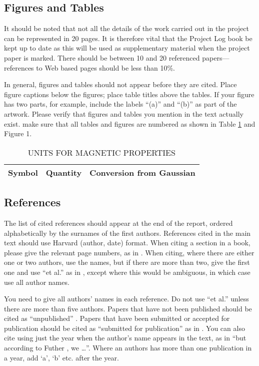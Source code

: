 \documentclass[12pt,a4paper]{article}
\begin{document}
\subsection{Figures and Tables}
It should be noted that not all the details of the work carried out in the project can be represented in 20 pages.  It is therefore vital that the Project Log book be kept up to date as this will be used as supplementary material when the project paper is marked.  There should be between 10 and 20 referenced papers---references to Web based pages should be less than 10\%.

In general, figures and tables should not appear before they are cited.  Place figure captions below the figures; place table titles above the tables.  If your figure has two parts, for example, include the labels ``(a)'' and ``(b)'' as part of the artwork.  Please verify that figures and tables you mention in the text actually exist.  make sure that all tables and figures are numbered as shown in Table \ref{units} and Figure 1.

\begin{table}[htb]
	\centering
	\caption{UNITS FOR MAGNETIC PROPERTIES}
	\vspace*{6pt}
	\label{units}
	\begin{tabular}{ccc}\hline\hline
		Symbol & Quantity & Conversion from Gaussian \\ \hline
	\end{tabular}
\end{table}

\subsection{References}

The list of cited references should appear at the end of the report, ordered alphabetically by the surnames of the first authors.  References cited in the main text should use Harvard (author, date) format.  When citing a section in a book, please give the relevant page numbers, as in \cite[p293]{budgen}.  When citing, where there are either one or two authors, use the names, but if there are more than two, give the first one and use ``et al.'' as in  , except where this would be ambiguous, in which case use all author names.

You need to give all authors' names in each reference.  Do not use ``et al.'' unless there are more than five authors.  Papers that have not been published should be cited as ``unpublished'' \cite{euther}.  Papers that have been submitted or accepted for publication should be cited as ``submitted for publication'' as in \cite{futher} .  You can also cite using just the year when the author's name appears in the text, as in ``but according to Futher \citeyear{futher}, we \dots''.  Where an authors has more than one publication in a year, add `a', `b' etc. after the year.
\end{document}
